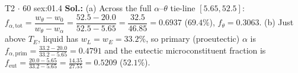 \begin{quicksheet}
\begin{twocol}[0.50]
\begin{workedexample}{T2 $\cdot$ 60 s}{ex:01.4}
\textbf{Sol.:} (a) Across the full $\alpha$--$\theta$ tie-line $[5.65, 52.5]$:
$f_{\alpha,\mathrm{tot}} = \dfrac{w_\theta - w_0}{w_\theta - w_\alpha} = \dfrac{52.5 - 20.0}{52.5 - 5.65} = \dfrac{32.5}{46.85} = 0.6937$ ($69.4\%$), $f_\theta = 0.3063$.
(b) Just above $T_E$, liquid has $w_L = w_E = 33.2\%$, so primary (proeutectic) $\alpha$ is $f_{\alpha,\mathrm{prim}} = \frac{33.2 - 20.0}{33.2 - 5.65} = 0.4791$ and the eutectic microconstituent fraction is $f_{\mathrm{eut}} = \frac{20.0 - 5.65}{33.2 - 5.65} = \frac{14.35}{27.55} = 0.5209$ ($52.1\%$).
\end{workedexample}
\end{twocol}
\end{quicksheet}

